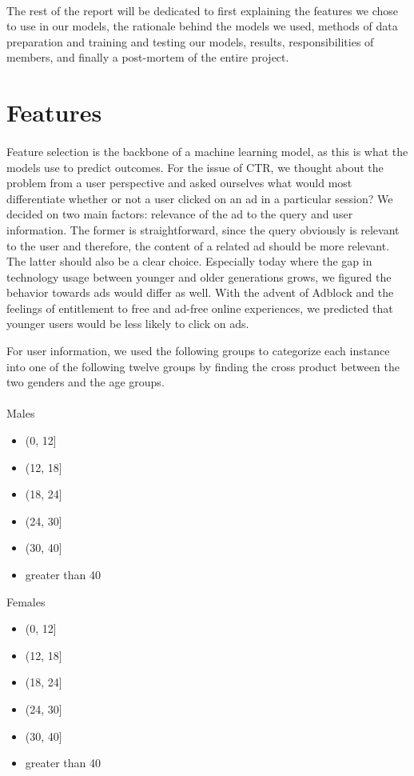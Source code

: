\documentclass[11pt]{article}
\begin{document}
\paragraph{}
The rest of the report will be dedicated to first explaining the features we chose to use in our models,  the rationale behind the models we used, methods of data preparation and training and testing our models, results, responsibilities of members, and finally a post-mortem of the entire project.

\section*{Features}
\paragraph{}
Feature selection is the backbone of a machine learning model, as this is what the models use to predict outcomes. For the issue of CTR, we thought about the problem from a user perspective and asked ourselves what would most differentiate whether or not a user clicked on an ad in a particular session? We decided on two main factors: relevance of the ad to the query and user information. The former is straightforward, since the query obviously is relevant to the user and therefore, the content of a related ad should be more relevant. The latter should also be a clear choice. Especially today where the gap in technology usage between younger and older generations grows, we figured the behavior towards ads would differ as well. With the advent of Adblock and the feelings of entitlement to free and ad-free online experiences, we predicted that younger users would be less likely to click on ads.

For user information, we used the following groups to categorize each instance into one of the following twelve groups by finding the cross product between the two genders and the age groups. \\

\paragraph{}
\begin{multicols}{2}
Males
\begin{itemize}
\item (0, 12]
\item  (12, 18]
\item  (18, 24]
\item  (24, 30]
\item  (30,  40]
\item  greater than 40
\end{itemize}

Females
\begin{itemize}
\item (0, 12]
\item  (12, 18]
\item  (18, 24]
\item  (24, 30]
\item  (30,  40]
\item  greater than 40
\end{itemize}
\end{multicols}
\end{document}
